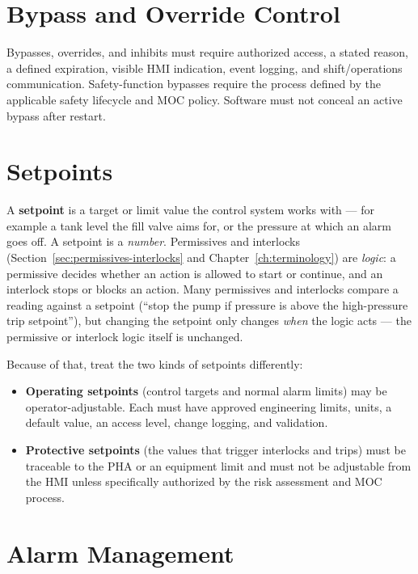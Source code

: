 \section{Bypass and Override Control}

Bypasses, overrides, and inhibits must require authorized access, a stated reason, a defined expiration, visible HMI indication, event logging, and shift/operations communication. Safety-function bypasses require the process defined by the applicable safety lifecycle and MOC policy. Software must not conceal an active bypass after restart.

\section{Setpoints}
A \textbf{setpoint} is a target or limit value the control system works with --- for example a tank level the fill valve aims for, or the pressure at which an alarm goes off. A setpoint is a \emph{number}. Permissives and interlocks (Section~\ref{sec:permissives-interlocks} and Chapter~\ref{ch:terminology}) are \emph{logic}: a permissive decides whether an action is allowed to start or continue, and an interlock stops or blocks an action. Many permissives and interlocks compare a reading against a setpoint (``stop the pump if pressure is above the high-pressure trip setpoint''), but changing the setpoint only changes \emph{when} the logic acts --- the permissive or interlock logic itself is unchanged.

Because of that, treat the two kinds of setpoints differently:
\begin{itemize}[itemsep=2pt]
  \item \textbf{Operating setpoints} (control targets and normal alarm limits) may be operator-adjustable. Each must have approved engineering limits, units, a default value, an access level, change logging, and validation.
  \item \textbf{Protective setpoints} (the values that trigger interlocks and trips) must be traceable to the PHA or an equipment limit and must not be adjustable from the HMI unless specifically authorized by the risk assessment and MOC process.
\end{itemize}

\section{Alarm Management}

